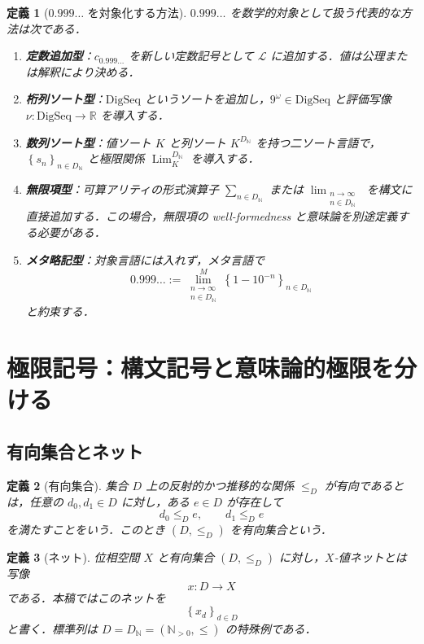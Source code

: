 \documentclass[a4paper,11pt]{ltjsarticle}
\theoremstyle{jpdef}
\newtheorem{definition}{定義}[section]
\theoremstyle{jpthm}
\newcommand{\N}{\mathbb{N}}
\newcommand{\R}{\mathbb{R}}
\newcommand{\Lang}{\mathcal L}
\newcommand{\Lim}{\operatorname{Lim}}
\newcommand{\Ns}{\N_{>0}}
\newcommand{\DN}{D_{\N}}
\newcommand{\seq}[2]{\left\{#1\right\}_{#2}}
\begin{document}
\begin{definition}[\(0.999\ldots\) を対象化する方法]
\(0.999\ldots\) を数学的対象として扱う代表的な方法は次である．
\begin{enumerate}
\item \textbf{定数追加型}：\(c_{0.999\ldots}\) を新しい定数記号として \(\Lang\) に追加する．値は公理または解釈により決める．
\item \textbf{桁列ソート型}：\(\mathrm{DigSeq}\) というソートを追加し，\(9^\omega\in\mathrm{DigSeq}\) と評価写像 \(\nu:\mathrm{DigSeq}\to\R\) を導入する．
\item \textbf{数列ソート型}：値ソート \(K\) と列ソート \(K^{\DN}\) を持つ二ソート言語で，\(\seq{s_n}{n\in\DN}\) と極限関係 \(\Lim_K^{\DN}\) を導入する．
\item \textbf{無限項型}：可算アリティの形式演算子 \(\sum_{n\in\DN}\) または \(\lim_{\substack{n\to\infty\\ n\in\DN}}\) を構文に直接追加する．この場合，無限項の well-formedness と意味論を別途定義する必要がある．
\item \textbf{メタ略記型}：対象言語には入れず，メタ言語で
\[
  0.999\ldots := \lim_{\substack{n\to\infty\\ n\in\DN}}^{M}\seq{1-10^{-n}}{n\in\DN}
\]
と約束する．
\end{enumerate}
\end{definition}

\section{極限記号：構文記号と意味論的極限を分ける}

\subsection{有向集合とネット}

\begin{definition}[有向集合]
集合 \(D\) 上の反射的かつ推移的な関係 \(\le_D\) が有向であるとは，任意の \(d_0,d_1\in D\) に対し，ある \(e\in D\) が存在して
\[
  d_0\le_D e,
  \qquad
  d_1\le_D e
\]
を満たすことをいう．このとき \((D,\le_D)\) を有向集合という．
\end{definition}

\begin{definition}[ネット]
位相空間 \(X\) と有向集合 \((D,\le_D)\) に対し，\(X\)-値ネットとは写像
\[
  x:D\to X
\]
である．本稿ではこのネットを
\[
  \seq{x_d}{d\in D}
\]
と書く．標準列は \(D=\DN=(\Ns,\le)\) の特殊例である．
\end{definition}
\end{document}
